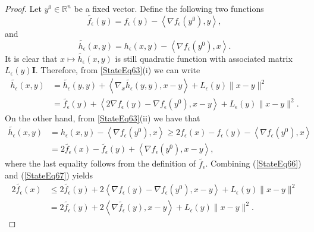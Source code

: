 \documentclass[11pt]{article}
\numberwithin{equation}{section}
\begin{document}
\begin{proof}
Let $y^0 \in \mathbb{R}^n$ be a fixed vector. Define the following two functions
\begin{equation*}
	\widetilde{f_{\epsilon}}(y) = f_{\epsilon}(y) - \left\langle \nabla f_{\epsilon}(y^0), y \right\rangle ,
\end{equation*}
and 
 \begin{equation*}
	\widetilde{h_{\epsilon}}(x,y) = h_{\epsilon}(x,y) - \left\langle \nabla f_{\epsilon}(y^0), x \right\rangle .
\end{equation*}
It is clear that $x \mapsto \widetilde{h_{\epsilon}}(x,y)$ is still quadratic function with associated matrix $L_{\epsilon}(y)\mathbf{I}$. Therefore, from \ref{StateEq63}(i) we can write
\begin{equation}
\begin{aligned}
	\widetilde{h_{\epsilon}}(x,y) &= \widetilde{h_{\epsilon}}(y,y) + \left\langle \nabla_x \widetilde{h_{\epsilon}}(y,y), x-y \right\rangle + L_{\epsilon}(y) \|x-y\|^2 \\
	&= \widetilde{f_{\epsilon}}(y) + \left\langle 2\nabla f_{\epsilon}(y) - \nabla f_{\epsilon}(y^0), x-y \right\rangle + L_{\epsilon}(y) \|x-y\|^2.	\label{StateEq66}
\end{aligned}
\end{equation}
On the other hand, from \ref{StateEq63}(ii) we have that
\begin{equation}
\begin{aligned}
	\widetilde{h_{\epsilon}}(x,y) &= h_{\epsilon}(x,y) - \left\langle	\nabla f_{\epsilon}(y^0),x \right\rangle \geq 2f_{\epsilon}(x) - f_{\epsilon}(y) - \left\langle \nabla f_{\epsilon}(y^0),x \right\rangle \\
	&= 2 \widetilde{f_{\epsilon}}(x) - \widetilde{f_{\epsilon}}(y) + \left\langle \nabla f_{\epsilon}(y^0), x-y \right\rangle, \label{StateEq67}
\end{aligned}
\end{equation}
where the last equality follows from the definition of $\widetilde{f_{\epsilon}}$. Combining (\ref{StateEq66}) and (\ref{StateEq67}) yields
\begin{equation*}
\begin{aligned}
	2\widetilde{f_{\epsilon}}(x) &\leq 2\widetilde{f_{\epsilon}}(y) + 2 \left\langle \nabla f_{\epsilon}(y) - \nabla f_{\epsilon}(y^0), x-y \right\rangle + L_{\epsilon}(y) \|x-y\|^2 \\
	&= 2\widetilde{f_{\epsilon}}(y) + 2 \left\langle \nabla \widetilde{f_{\epsilon}}(y), x-y \right\rangle + L_{\epsilon}(y) \|x-y\|^2.

\end{aligned}
\end{equation*}
\end{proof}
\end{document}

